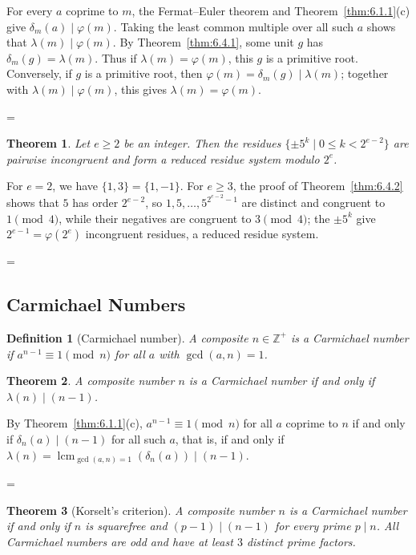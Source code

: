 \documentclass[11pt]{article}
\makeatletter
\theoremstyle{ntstyle}
\newtheorem{theorem}{Theorem}[subsection]
\newtheorem{definition}{Definition}[subsection]
\let\nt@closedisplay\]
\def\nt@guardedclose{\@ifnextchar\par{\nt@closeafterpar}{\@ifnextchar\end{\postdisplaypenalty\@M\nt@closedisplay}{\nt@closedisplay}}}
\def\nt@closeafterpar\par{\@ifnextchar\par{\nt@closeafterpar}{\@ifnextchar\end{\postdisplaypenalty\@M\nt@closedisplay\par}{\nt@closedisplay\par}}}
\renewenvironment{proof}[1][\proofname]{\par
  \pushQED{\qed}\normalfont\topsep\medskipamount\edef\nt@afterproof{\@endparpenalty=\the\@endparpenalty\relax}\@beginparpenalty\@M\@endparpenalty\@M\let\]\nt@guardedclose\trivlist\item[]\textit{#1\@addpunct{.}} \ignorespaces}{\ifvmode\addpenalty\@M\fi\popQED\nt@afterproof\endtrivlist\@endpefalse}
\DeclareMathOperator{\lcm}{lcm}
\makeatother
\begin{document}
\begin{proof} For every $a$ coprime to $m$, the Fermat--Euler theorem and
	Theorem~\ref{thm:6.1.1}(c) give
	$\delta_m(a)\mid\varphi(m)$. Taking the least common multiple over all
	such $a$ shows that $\lambda(m)\mid\varphi(m)$. By
	Theorem~\ref{thm:6.4.1}, some unit $g$ has
	$\delta_m(g)=\lambda(m)$. Thus if $\lambda(m)=\varphi(m)$, this $g$ is
	a primitive root. Conversely, if $g$ is a primitive root, then
	$\varphi(m)=\delta_m(g)\mid\lambda(m)$; together with
	$\lambda(m)\mid\varphi(m)$, this gives $\lambda(m)=\varphi(m)$.

\end{proof}
\begin{theorem}\label{thm:6.4.4} Let $e \ge 2$ be an integer. Then the residues
	$\{\pm5^k \mid 0\le k<2^{e-2}\}$ are pairwise incongruent and form a reduced
	residue system modulo $2^{e}$.

\end{theorem}

\begin{proof} For $e = 2$, we have $\{1, 3\} = \{1, -1\}$. For $e
		\ge 3$, the proof of Theorem~\ref{thm:6.4.2} shows that $5$ has
	order $2^{e-2}$, so $1, 5, \ldots,
		5^{2^{e-2}-1}$ are distinct and congruent to $1 \pmod{4}$, while their negatives are
	congruent to $3 \pmod{4}$; the $\pm 5^{k}$ give $2^{e-1} = \varphi(2^{e})$
	incongruent residues, a reduced residue system.

\end{proof}
\subsection{Carmichael Numbers}

\begin{definition}[Carmichael number]\label{def:6.5.1} A composite
	$n \in \mathbb{Z}^+$ is a Carmichael number if $a^{n-1} \equiv 1
		\pmod{n}$ for all $a$ with $\gcd(a, n) = 1$.

\end{definition}
\begin{theorem}\label{thm:6.5.1} A composite number $n$ is a
	Carmichael number if and only if $\lambda(n) \mid (n-1)$.

\end{theorem}

\begin{proof} By Theorem~\ref{thm:6.1.1}(c), $a^{n-1} \equiv 1
		\pmod{n}$ for all $a$ coprime to $n$ if and only if $\delta_n(a) \mid
		(n-1)$ for all such $a$, that is, if and only if $\lambda(n) =
		\lcm_{\gcd(a, n)=1}(\delta_n(a)) \mid (n-1)$.

\end{proof}
\begin{theorem}[Korselt's criterion]\label{thm:6.5.2} A composite
	number $n$ is a Carmichael number if and only if $n$ is squarefree
	and $(p-1) \mid (n-1)$ for every prime $p \mid n$. All Carmichael
	numbers are odd and have at least $3$ distinct prime factors.

\end{theorem}
\end{document}
